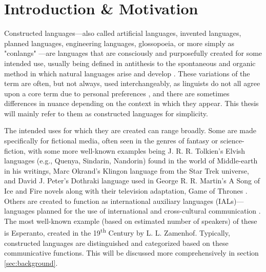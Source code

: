 \documentclass[12pt,a4paper]{article}
\numberwithin{figure}{section}
\numberwithin{table}{section}
\numberwithin{definition}{section}
\begin{document}
\section{Introduction \& Motivation} 
\label{sec:intro}


Constructed languages---also called artificial languages, invented languages, planned languages, engineering languages, glossopoeia, or more simply as "conlangs" \parencite{douglas2015book}---are languages that are consciously and purposefully created for some intended use, usually being defined in antithesis to the spontaneous and organic method in which natural languages arise and develop \parencite{sanders2016article}. These variations of the term are often, but not always, used interchangeably, as linguists do not all agree upon a core term due to personal preferences \parencite{Adelman2014article}, and there are sometimes differences in nuance depending on the context in which they appear. This thesis will mainly refer to them as constructed languages for simplicity.

The intended uses for which they are created can range broadly. Some are made specifically for fictional media, often seen in the genres of fantasy or science-fiction, with some more well-known examples being J. R. R. Tolkien's Elvish languages (e.g., Quenya, Sindarin, Nandorin) found in the world of Middle-earth in his writings, Marc Okrand's Klingon language from the Star Trek universe, and David J. Peter's Dothraki language used in George R. R. Martin's A Song of Ice and Fire novels along with their television adaptation, Game of Thrones \parencite{punske2020book}. Others are created to function as international auxiliary languages (IALs)---languages planned for the use of international and cross-cultural communication \parencite{Gobbo2016article}. The most well-known example (based on estimated number of speakers) of these is Esperanto, created in the 19\textsuperscript{th} Century by L. L. Zamenhof. Typically, constructed languages are distinguished and categorized based on these communicative functions. This will be discussed more comprehensively in section \ref{sec:background}. 

\end{document}
